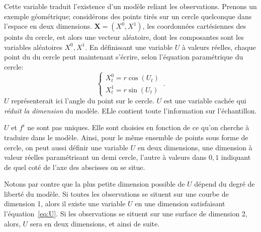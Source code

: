 Cette variable traduit l'existence d'un modèle reliant les observations.
Prenons un exemple géométrique; considérons des points tirés sur un cercle quelconque dans l'espace en deux dimensions. $\mathbf{X} = (X^0,X^1)$, les coordonnées cartésiennes des points du cercle, est alors une vecteur aléatoire, dont les composantes sont les variables aléatoires $X^0,X^1$. En définissant une variable $U$ à valeurs réelles, chaque point du du cercle peut maintenant s'écrire, selon l'équation paramétrique du cercle: 
$$
 \begin{cases}
     X^0_t = r  \cos(U_t)\\
     X^1_t = r \sin(U_t)
    \end{cases}\,.
$$
$U$ représenterait ici l'angle du point sur le cercle. $U$ est une variable cachée qui \emph{réduit la dimension} du modèle. ELle contient toute l'information sur l'échantillon. 

$U$ et ${f^i}$ ne sont pas uniques. Elle sont choisies en fonction de ce qu'on cherche à traduire dans le modèle. Ainsi, pour le même ensemble de points sous forme de cercle, on peut aussi définir une variable $U$ en deux dimensions, une dimension à valeur réelles paramétrisant un demi cercle, l'autre à valeurs dans ${0,1}$ indiquant de quel coté de l'axe des abscisses on se situe.

Notons par contre que la plus petite dimension possible de $U$ dépend du degré de liberté du modèle. Si toutes les observations se situent sur une courbe de dimension 1, alors il existe une variable $U$ en une dimension satisfaisant l'équation~\ref{eq:U}. Si les observations se situent sur une surface de dimension 2, alors, $U$ sera en deux dimensions, et ainsi de suite.


